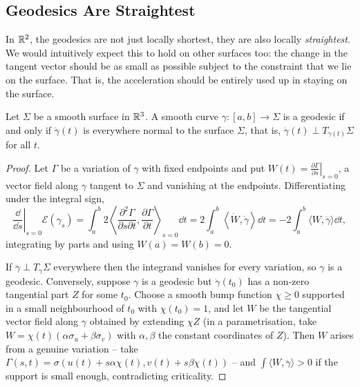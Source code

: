 \documentclass[a4paper]{scrartcl}
\begin{document}
\subsection{Geodesics Are Straightest}

In $\mathbb{R}^2$, the geodesics are not just locally shortest, they are also locally \emph{straightest}. We would intuitively expect this to hold on other surfaces too: the change in the tangent vector should be as small as possible subject to the constraint that we lie on the surface. That is, the acceleration should be entirely used up in staying on the surface.

\begin{theorem}
    Let $\Sigma$ be a smooth surface in $\mathbb{R}^3$. A smooth curve $\gamma:[a, b] \rightarrow \Sigma$ is a geodesic if and only if $\ddot{\gamma}(t)$ is everywhere normal to the surface $\Sigma$, that is, $\ddot\gamma(t) \perp T_{\gamma(t)}\Sigma$ for all $t$.
\end{theorem}
\begin{proof}
    Let $\Gamma$ be a variation of $\gamma$ with fixed endpoints and put $W(t) = \left.\frac{\partial \Gamma}{\partial s}\right|_{s=0}$, a vector field along $\gamma$ tangent to $\Sigma$ and vanishing at the endpoints. Differentiating under the integral sign,
    $$
    \left.\frac{\dd}{\dd s}\right|_{s=0}\mathcal E(\gamma_s) = \int_a^b 2\left\langle \frac{\partial^2\Gamma}{\partial s \partial t}, \frac{\partial\Gamma}{\partial t}\right\rangle_{s=0} \dd t = 2\int_a^b \left\langle \dot W, \dot\gamma\right\rangle \dd t = -2\int_a^b \langle W, \ddot\gamma\rangle\dd t,
    $$
    integrating by parts and using $W(a) = W(b) = 0$.

    If $\ddot\gamma \perp T_{\gamma}\Sigma$ everywhere then the integrand vanishes for every variation, so $\gamma$ is a geodesic. Conversely, suppose $\gamma$ is a geodesic but $\ddot\gamma(t_0)$ has a non-zero tangential part $Z$ for some $t_0$. Choose a smooth bump function $\chi \geq 0$ supported in a small neighbourhood of $t_0$ with $\chi(t_0) = 1$, and let $W$ be the tangential vector field along $\gamma$ obtained by extending $\chi Z$ (in a parametrisation, take $W = \chi(t)(\alpha\sigma_u + \beta\sigma_v)$ with $\alpha, \beta$ the constant coordinates of $Z$). Then $W$ arises from a genuine variation -- take $\Gamma(s,t) = \sigma(u(t) + s\alpha\chi(t), v(t) + s\beta\chi(t))$ -- and $\int \langle W, \ddot\gamma\rangle > 0$ if the support is small enough, contradicting criticality.
\end{proof}
\end{document}
